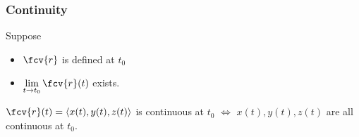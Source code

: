 \begin{frame}
\frametitle{Continuity}
\begin{definition}
Suppose
\begin{itemize}
\item $\fcv{r}$ is defined at $t_0$
\item<2-> $\lim\limits_{t\to t_0} \fcv{r}(t)$ exists.
\end{itemize}
\end{definition}
\begin{observation}
$\fcv{r}(t) = \langle x(t), y(t), z(t) \rangle$ is continuous at $t_0$ $\Longleftrightarrow$ $x(t), y(t), z(t) $ are all continuous at $t_0$.

\end{observation}  
  

\end{frame}
